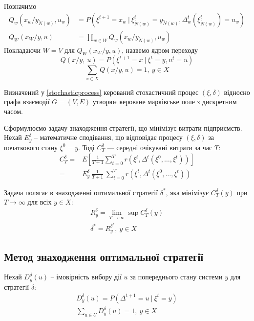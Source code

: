 \documentclass[oneside,14pt]{extarticle}
\begin{document}
\begin{definition} 
Позначимо
\begin{align*}
Q_w(x_w / y_{\tilde{N}(w)}, u_w) &= P(\xi^{t+1} = x_w\ |\ \xi_{\tilde{N}(w)}^t = y_{\tilde{N}(w)}, \Delta_w^t(\xi_{\tilde{N}(w)}^t) = u_w) \\
Q_W(x_W / y, u) &= \prod_{w \in W} Q_w(x_w / y_{\tilde{N}(w)}, u_w)
\end{align*}
Покладаючи \(W = V\) для \( Q_W(x_W / y, u) \), назвемо ядром переходу
\[Q(x/y,\ u) = P(\xi^{t+1} = x\ |\ \xi^t = y, u^t = u)\]
\[\sum_{x \in X}Q(x/y, u) = 1,\ y \in X\]
\end{definition}

Визначений у \ref{stochasticprocess} керований стохастичний процес \((\xi, \delta)\) відносно графа взаємодії \(G = (V, E)\) утворює кероване марківське поле з дискретним часом.

Сформулюємо задачу знаходження стратегії, що мінімізує витрати підприємств. Нехай \(E_y^\delta\) – математичне сподівання, що відповідає процесу \((\xi, \delta)\) за початкового стану \(\xi^0 = y\).  Тоді \(C_T^\delta\) — середні очікувані витрати за час \(T\):
\begin{align*}
C_T^{\delta} = &E\left[\frac{1}{T+1}\sum_{t=0}^T r(\xi^t, \Delta^t(\xi^0, \ldots, \xi^t))\right] \\
 = &E_y^\delta\ \frac{1}{T+1}\ \sum_{t=0}^T r(\xi^t, \Delta^t(\xi^0, \ldots, \xi^t))
\end{align*}

Задача полягає в знаходженні оптимальної стратегії \(\delta^*\), яка мінімізує \(C_T^{\delta}(y)\) при \(T\rightarrow\infty\) для всіх \(y \in X\):
\begin{gather*}
R_y^\delta = \lim\limits_{T \rightarrow \infty} \sup C_T^{\delta}(y) \\
\delta^* = R_y^{\delta^*},\ y \in X
\end{gather*}












\subsection{Метод знаходження оптимальної стратегії}

Нехай \(D_y^{\delta}(u)\) – імовірність вибору дії \(u\) за попереднього стану системи \(y\) для стратегії \(\delta\):
\begin{gather*}
D_y^{\delta}(u) = P(\Delta^{t+1} = u\ |\ \xi^t = y) \\ \sum_{u \in U} D_y^\delta(u) = 1,\ y \in X
\end{gather*}
\end{document}
